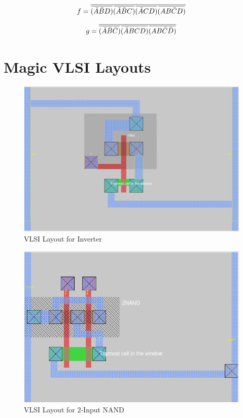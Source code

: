 \documentclass[12pt]{article}
\newcommand{\overbar}[1]{\mkern 1.5mu\overline{\mkern-1.5mu#1\mkern-1.5mu}\mkern 1.5mu} %
\begin{document}
\begin{equation}
f = \overline{\overbar{(\bar{A}\bar{B}D)}\overbar{(\bar{A}\bar{B}C)}\overbar{(\bar{A}CD)}\overbar{(AB\bar{C}D)}}
\end{equation}

\begin{equation}
g = \overline{\overbar{(\bar{A}\bar{B}\bar{C})}\overbar{(\bar{A}BCD)}\overbar{(AB\bar{C}\bar{D})}}
\end{equation}

\newpage
\section{Magic VLSI Layouts}
\label{app:magic_vlsi_layouts}

\begin{figure}[H]
	\centering
	\includegraphics[width=0.70\linewidth, keepaspectratio]{Graphics/1INV}
	\caption{VLSI Layout for Inverter}
	\label{fig:magic_inv}
\end{figure}

\begin{figure}[H]
	\centering
	\includegraphics[width=0.70\linewidth, keepaspectratio]{Graphics/2NAND}
	\caption{VLSI Layout for 2-Input NAND}
	\label{fig:magic_NAND2}
\end{figure}
\end{document}
